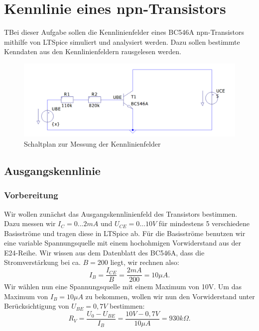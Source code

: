 \documentclass{article}
\begin{document}
\tableofcontents


\newpage


\section{Kennlinie eines npn-Transistors}
\begin{task}
  TBei dieser Aufgabe sollen die Kennlinienfelder eines BC546A npn-Transistors mithilfe von LTSpice simuliert und analysiert werden. Dazu sollen bestimmte Kenndaten aus den Kennlinienfeldern rausgelesen werden.
\end{task}

\begin{figure}[h]
  \centering
  \includegraphics[scale=0.5]{../assets/images/EL1P3/Schaltplan1.png}
  \caption{Schaltplan zur Messung der Kennlinienfelder}
  \label{fig:schalt1}
\end{figure}

\subsection{Ausgangskennlinie}
\label{sec:ausgangskennlinie}

\subsubsection{Vorbereitung}


Wir wollen zunächst das Ausgangskennlinienfeld des Transistors bestimmen. Dazu messen wir $I_{C} = 0...2mA$ und $U_{CE} = 0...10V$ für mindestens 5 verschiedene Basisströme und tragen diese
in LTSpice ab. Für die Basisströme benutzen wir eine variable Spannungsquelle mit einem hochohmigen Vorwiderstand aus der E24-Reihe. Wir wissen aus dem Datenblatt des BC546A, dass die Stromverstärkung bei ca. $B=200$ liegt, wir rechnen also:
\begin{equation}
  \label{eq:1}
  I_{B} = \frac{I_{CE}}{B} = \frac{2mA}{200} = 10\mu A.
\end{equation}
Wir wählen nun eine Spannungsquelle mit einem Maximum von 10V. Um das Maximum von $I_{B} = 10\mu A$ zu bekommen, wollen wir nun den Vorwiderstand unter Berücksichtigung von $U_{BE} = 0,7V$ bestimmen:
\begin{equation}
  \label{eq:2}
  R_{V} = \frac{U_{0}-U_{BE}}{I_{B}} = \frac{10V-0,7V}{10\mu A} = 930k\Omega.
\end{equation}
\end{document}
